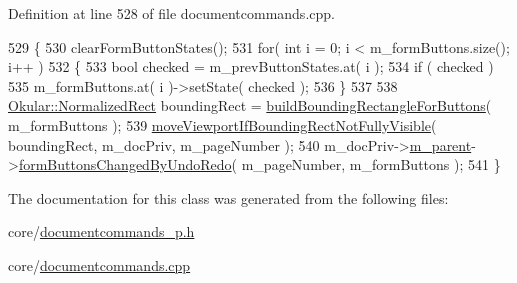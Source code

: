Definition at line 528 of file documentcommands.\+cpp.


\begin{DoxyCode}
529 \{
530     clearFormButtonStates();
531     \textcolor{keywordflow}{for}( \textcolor{keywordtype}{int} i = 0; i < m\_formButtons.size(); i++ )
532     \{
533         \textcolor{keywordtype}{bool} checked = m\_prevButtonStates.at( i );
534         \textcolor{keywordflow}{if} ( checked )
535             m\_formButtons.at( i )->setState( checked );
536     \}
537 
538     \hyperlink{classOkular_1_1NormalizedRect}{Okular::NormalizedRect} boundingRect = 
      \hyperlink{namespaceOkular_a3421c387b60db316a9ef570d16a2e7d0}{buildBoundingRectangleForButtons}( m\_formButtons );
539     \hyperlink{namespaceOkular_a1e0f22fec5a200bd3b1835b7bfd95172}{moveViewportIfBoundingRectNotFullyVisible}( boundingRect, 
      m\_docPriv, m\_pageNumber );
540     m\_docPriv->\hyperlink{classOkular_1_1DocumentPrivate_ac921eda41c014869ffec96ecc569c713}{m\_parent}->\hyperlink{classOkular_1_1Document_adbfa4da2eb8267d4bde6a9c6784e033b}{formButtonsChangedByUndoRedo}( m\_pageNumber, 
      m\_formButtons );
541 \}
\end{DoxyCode}


The documentation for this class was generated from the following files\+:\begin{DoxyCompactItemize}
\item 
core/\hyperlink{documentcommands__p_8h}{documentcommands\+\_\+p.\+h}\item 
core/\hyperlink{documentcommands_8cpp}{documentcommands.\+cpp}\end{DoxyCompactItemize}
